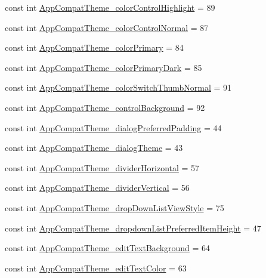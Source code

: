 \begin{CompactItemize}
\item 
const int \hyperlink{class__2doo_1_1_droid_1_1_resource_1_1_styleable_1915333a3e807e476382a75db369df65}{AppCompatTheme\_\-colorControlHighlight} = 89
\item 
const int \hyperlink{class__2doo_1_1_droid_1_1_resource_1_1_styleable_57fa0b3778eeb74dd351b77f6eb91cbb}{AppCompatTheme\_\-colorControlNormal} = 87
\item 
const int \hyperlink{class__2doo_1_1_droid_1_1_resource_1_1_styleable_fc888765a200fc44e49c15bdab31f20b}{AppCompatTheme\_\-colorPrimary} = 84
\item 
const int \hyperlink{class__2doo_1_1_droid_1_1_resource_1_1_styleable_0c0118f05e0f61d2d4106267c5f827b7}{AppCompatTheme\_\-colorPrimaryDark} = 85
\item 
const int \hyperlink{class__2doo_1_1_droid_1_1_resource_1_1_styleable_195efb0e4ef62e0ad6e3cecdf65f7ea6}{AppCompatTheme\_\-colorSwitchThumbNormal} = 91
\item 
const int \hyperlink{class__2doo_1_1_droid_1_1_resource_1_1_styleable_7b44d9da8fb2657030a49c552e88421e}{AppCompatTheme\_\-controlBackground} = 92
\item 
const int \hyperlink{class__2doo_1_1_droid_1_1_resource_1_1_styleable_4d79cc56e9443f03493ad02c0f820905}{AppCompatTheme\_\-dialogPreferredPadding} = 44
\item 
const int \hyperlink{class__2doo_1_1_droid_1_1_resource_1_1_styleable_7c581d5d57037cb08ae2fc78164062a8}{AppCompatTheme\_\-dialogTheme} = 43
\item 
const int \hyperlink{class__2doo_1_1_droid_1_1_resource_1_1_styleable_09677d1a82c5d386b4a98f0ffbe0f3c6}{AppCompatTheme\_\-dividerHorizontal} = 57
\item 
const int \hyperlink{class__2doo_1_1_droid_1_1_resource_1_1_styleable_34e2f87a15ec82e753d0b3615bb60f12}{AppCompatTheme\_\-dividerVertical} = 56
\item 
const int \hyperlink{class__2doo_1_1_droid_1_1_resource_1_1_styleable_0dbc770ffd04a5bdc8970bb9ba61f80f}{AppCompatTheme\_\-dropDownListViewStyle} = 75
\item 
const int \hyperlink{class__2doo_1_1_droid_1_1_resource_1_1_styleable_ce2186645b433b099cdfc1d7267a3fc5}{AppCompatTheme\_\-dropdownListPreferredItemHeight} = 47
\item 
const int \hyperlink{class__2doo_1_1_droid_1_1_resource_1_1_styleable_f61075121e290e0adf36ccf8579da976}{AppCompatTheme\_\-editTextBackground} = 64
\item 
const int \hyperlink{class__2doo_1_1_droid_1_1_resource_1_1_styleable_554df21d1fc20cf68f83fb093943e65c}{AppCompatTheme\_\-editTextColor} = 63

\end{CompactItemize}
